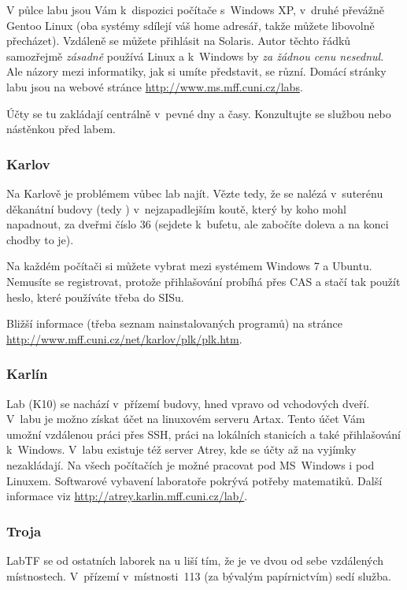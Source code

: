 V půlce labu jsou Vám k~dispozici počítače s~Windows XP, v~druhé převážně Gentoo Linux (oba systémy sdílejí váš home adresář, takže můžete li\-bo\-vol\-ně pře\-chá\-zet). Vzdá\-le\-ně se můžete přihlásit na Solaris. Autor těchto řádků samozřejmě {\it zásadně} používá Linux a k~Windows by {\it za žádnou cenu nesednul}. Ale názory mezi informatiky, jak si umíte představit, se různí. Domácí stránky labu jsou na webové stránce \url{http://www.ms.mff.cuni.cz/labs}.

Účty se tu zakládají centrálně v~pevné dny a časy. Konzultujte se
službou nebo nástěnkou před labem.

\subsubsection{Karlov}

Na Karlově je problémem vůbec lab najít. Vězte tedy, že se nalézá
v~suterénu děkanátní budovy (tedy ) v~nejzapadlejším koutě,
který by koho mohl napadnout, za dveřmi číslo 36 (sejdete
k~bufetu, ale zabočíte doleva a na konci chodby to je). 

Na každém počítači si můžete vybrat mezi systémem Windows 7 a Ubuntu. Nemusíte se registrovat, protože přihlašování probíhá přes CAS a stačí tak použít heslo, které používáte třeba do SISu.

Bližší informace (třeba seznam nainstalovaných programů) na stránce \url{http://www.mff.cuni.cz/net/karlov/plk/plk.htm}.

\subsubsection{Karlín}

Lab (K10) se nachází v~přízemí budovy, hned vpravo od vchodových
dveří. V~labu je možno získat účet na linuxovém serveru Artax.
Tento účet Vám umožní vzdálenou práci přes SSH, práci na lokálních
stanicích a také přihlašování k~Windows. V~labu existuje též
server Atrey, kde se účty až na vyjímky nezakládají. Na všech
počítačích je možné pracovat pod MS~Windows i pod Linuxem.
Softwarové vybavení laboratoře pokrývá potřeby matematiků. Další
informace viz \url{http://atrey.karlin.mff.cuni.cz/lab/}.

\subsubsection{Troja}

LabTF se od ostatních laborek na \mfz{}u liší tím, že je ve dvou od
sebe vzdálených místnostech.  V~přízemí v~místnosti~113 (za
bývalým papírnictvím) sedí služba.

